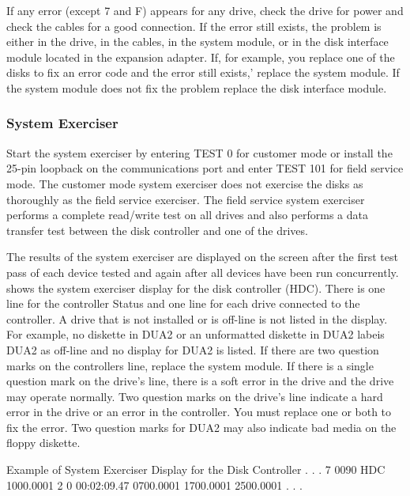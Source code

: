 If any error (except 7 and F) appears for any drive, check the drive for
power and check the cables for a good connection. If the error still exists,
the problem is either in the drive, in the cables, in the system module, or in
the disk interface module located in the expansion adapter. If, for example,
you replace one of the disks to fix an error code and the error still exists,'
replace the system module. If the system module does not fix the problem
replace the disk interface module.

\subsubsection{System Exerciser}

Start the system exerciser by entering TEST 0 for customer mode or install
the 25-pin loopback on the communications port and enter TEST 101 for
field service mode. The customer mode system exerciser does not exercise
the disks as thoroughly as the field service exerciser. The field service
system exerciser performs a complete read/write test on all drives and also
performs a data transfer test between the disk controller and one of the
drives.

The results of the system exerciser are displayed on the screen after the
first test pass of each device tested and again after all devices have been
run concurrently.  shows the system exerciser display for the
disk controller (HDC). There is one line for the controller Status and one
line for each drive connected to the controller. A drive that is not installed
or is off-line is not listed in the display. For example, no diskette in DUA2
or an unformatted diskette in DUA2 labeis DUA2 as off-line and no display
for DUA2 is listed. If there are two question marks on the controllers line,
replace the system module. If there is a single question mark on the drive's
line, there is a soft error in the drive and the drive may operate normally.
Two question marks on the drive's line indicate a hard error in the drive
or an error in the controller. You must replace one or both to fix the error.
Two question marks for DUA2 may also indicate bad media on the floppy
diskette.

\begin{ttfig}{Example of System Exerciser Display for the Disk Controller}
.
.
.
7  0090    HDC    1000.0001     2     0 00:02:09.47
                  0700.0001
                  1700.0001
                  2500.0001
.
.
.
\end{ttfig}

